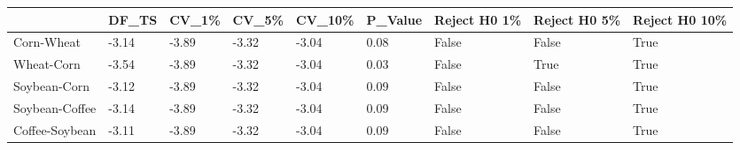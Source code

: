 \begin{tabular}{lllllllll}
\toprule
{} &  DF\_TS &  CV\_1\% &  CV\_5\% & CV\_10\% & P\_Value &  Reject H0 1\% &  Reject H0 5\% &  Reject H0 10\% \\
\midrule
Corn-Wheat     &  -3.14 &  -3.89 &  -3.32 &  -3.04 &    0.08 &         False &         False &           True \\
Wheat-Corn     &  -3.54 &  -3.89 &  -3.32 &  -3.04 &    0.03 &         False &          True &           True \\
Soybean-Corn   &  -3.12 &  -3.89 &  -3.32 &  -3.04 &    0.09 &         False &         False &           True \\
Soybean-Coffee &  -3.14 &  -3.89 &  -3.32 &  -3.04 &    0.09 &         False &         False &           True \\
Coffee-Soybean &  -3.11 &  -3.89 &  -3.32 &  -3.04 &    0.09 &         False &         False &           True \\
\bottomrule
\end{tabular}
